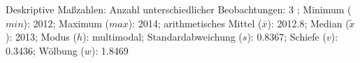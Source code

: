 				\label{tableValues:bfec153d}
				\vspace*{-\baselineskip}
                    \begin{noten}
                	    \note{} Deskriptive Maßzahlen:
                	    Anzahl unterschiedlicher Beobachtungen: 3%
                	    ; 
                	      Minimum ($min$): 2012; 
                	      Maximum ($max$): 2014; 
                	      arithmetisches Mittel ($\bar{x}$): \num[round-mode=places,round-precision=2]{2012.8}; 
                	      Median ($\tilde{x}$): 2013; 
                	      Modus ($h$): multimodal; 
                	      Standardabweichung ($s$): \num[round-mode=places,round-precision=2]{0.8367}; 
                	      Schiefe ($v$): \num[round-mode=places,round-precision=2]{0.3436}; 
                	      Wölbung ($w$): \num[round-mode=places,round-precision=2]{1.8469}
                     \end{noten}

